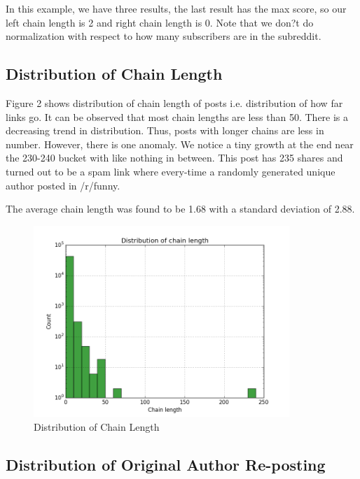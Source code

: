 \documentclass{article} %
\begin{document}
In this example, we have three results, the last result has the max score, so our left chain length is 2 and right chain length is 0.  Note that we don?t do normalization with respect to how many subscribers are in the subreddit.

\newpage

\subsection{Distribution of Chain Length}

Figure 2 shows distribution of chain length of posts i.e. distribution of how far links go. It can be observed that most chain lengths are less than 50. There is a decreasing trend in distribution. Thus, posts with longer chains are less in number. However, there is one anomaly. We notice a tiny growth at the end near the 230-240 bucket with like nothing in between. This post has 235 shares and turned out to be a spam link where every-time a randomly generated unique author posted in /r/funny.

The average chain length was found to be 1.68 with a standard deviation of 2.88.

\begin{figure}[h]
\begin{center}
\includegraphics[width=3.8in]{lengths.png}
\caption{Distribution of Chain Length}
\end{center}
\end{figure}


\subsection{Distribution of Original Author Re-posting}
\end{document}
